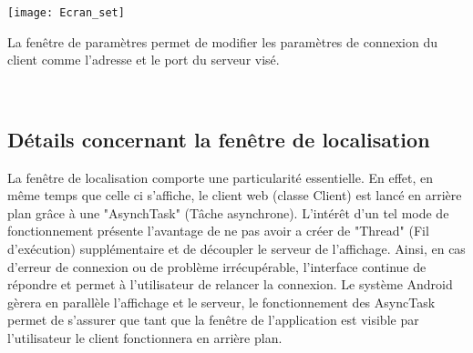 	\begin{minipage}{0.35\linewidth}
  	\centering
 	 \texttt{[image: Ecran\_set]}
	\end{minipage}
	\begin{minipage}{0.45\linewidth}
	La fenêtre de paramètres permet de modifier les paramètres de connexion du client comme l'adresse et le port du serveur visé.
	\end{minipage}
	~\\	
	
\subsection{Détails concernant la fenêtre de localisation}

	La fenêtre de localisation comporte une particularité essentielle. En effet, en même temps que celle ci s'affiche, le client web (classe Client) est lancé en arrière plan grâce à une "AsynchTask" (Tâche asynchrone). L'intérêt d'un tel mode de fonctionnement présente l'avantage de ne pas avoir a créer de "Thread" (Fil d'exécution) supplémentaire et de découpler le serveur de l'affichage. Ainsi, en cas d'erreur de connexion ou de problème irrécupérable, l'interface continue de répondre et permet à l'utilisateur de relancer la connexion. Le système Android gèrera en parallèle l'affichage et le serveur, le fonctionnement des AsyncTask permet de s'assurer que tant que la fenêtre de l'application est visible par l'utilisateur le client fonctionnera en arrière plan.
	
	 

	

